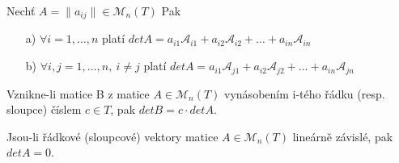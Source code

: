 \begin{sentence}
	Nechť $A = \| a_{ij} \|  \in \mathscr{M}_n(T)$ Pak
	\begin{itemize}
		\item[a)] $\forall i = 1, \dots, n$ platí $detA =  a_{i1}\mathscr{A}_{i1} +  a_{i2}\mathscr{A}_{i2} + \dots +  a_{in}\mathscr{A}_{in}$
		\item[b)] $\forall i,j = 1, \dots, n,\ i \not=j$ platí $detA =  a_{i1}\mathscr{A}_{j1} +  a_{i2}\mathscr{A}_{j2} + \dots +  a_{in}\mathscr{A}_{jn}$
	\end{itemize}
\end{sentence}

\begin{sentence}
	Vznikne-li matice B z matice $A \in \mathscr{M}_n(T)$ vynásobením i-tého řádku (resp. sloupce) číslem $c \in T$, pak $detB = c \cdot detA$.
\end{sentence}

\begin{sentence}
	Jsou-li řádkové (sloupcové) vektory matice $A \in \mathscr{M}_n(T)$ lineárně závislé, pak $detA = 0$.
\end{sentence}


